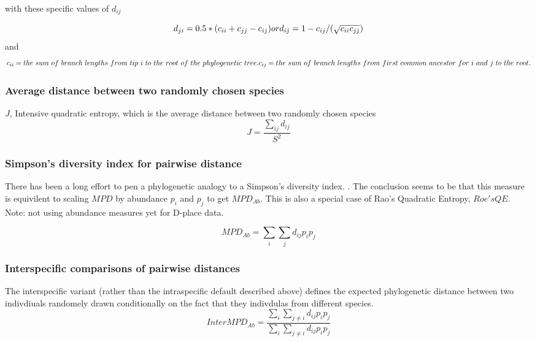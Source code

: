 \documentclass[]{book}
\theoremstyle{definition}
\theoremstyle{definition}
\theoremstyle{definition}
\theoremstyle{remark}
\begin{document}
with these specific values of \(d_{ij}\)

\[
d_{ji}=0.5*(c_{ii} + c_{jj} - c_{ij}) \\ 
\ \\
or \\
\ \\
d_{ij} = 1 - c_{ij} / (\sqrt{c_{ii}c_{jj}}) 
\] and \[
c_{ii} = the \ sum \ of \ branch \ lengths \ from \ tip \ i  \ to \ the \ root \ of \ the \ phylogenetic \ tree. \\
\ \\
c_{ij} = the \ sum \  of \ branch \ lengths \ from \ first \ common \ ancestor \ for \ i \ and \ j \ to \ the \ root.
\]

\subsubsection{Average distance between two randomly chosen
species}\label{average-distance-between-two-randomly-chosen-species}

\(J\), Intensive quadratic entropy, which is the average distance
between two randomly chosen species \citep{Izsak2000}
\[J = \dfrac{\sum_{ij}d_{ij}}{S^2} \]

\subsubsection{Simpson's diversity index for pairwise
distance}\label{simpsons-diversity-index-for-pairwise-distance}

There has been a long effort to pen a phylogenetic analogy to a
Simpson's diversity index.
\citep{Rao1982, Clarke1998, Pavoine2005, Hardy2007, Webb2002, Webb2008, Kembel2010}.
The conclusion seems to be that this measure is equivilent to scaling
\(MPD\) by abundance \(p_{i}\) and \(p_{j}\) to get \(MPD_{Ab}\). This
is also a special case of Rao's Quadratic Entropy, \(Roe's QE\). Note:
not using abundance measures yet for D-place data.

\[MPD_{Ab} = \sum_{i} \sum_{j} d_{ij} p_{i} p_{j}\]

\subsubsection{Interspecific comparisons of pairwise
distances}\label{interspecific-comparisons-of-pairwise-distances}

The interspecific variant (rather than the intraspecific default
described above) defines the expected phylogenetic distance between two
indivdiuals randomely drawn conditionally on the fact that they
indivdulas from different species.
\[InterMPD_{Ab} = \dfrac{\sum_{i} \sum_{j \ne i} d_{ij} p_{i} p_{j} }{\sum_{i} \sum_{j \ne i} d_{ij} p_{i} p_{j}}  \]
\end{document}
